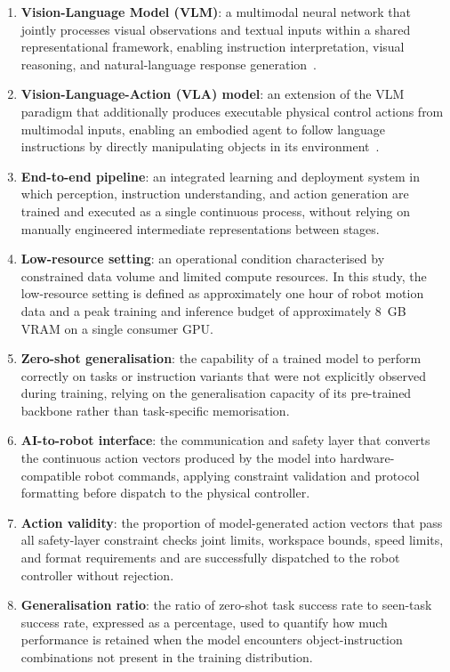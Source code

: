 \begin{enumerate}
    \item \textbf{Vision-Language Model (VLM)}: a multimodal neural network
    that jointly processes visual observations and textual inputs within a shared
    representational framework, enabling instruction interpretation, visual
    reasoning, and natural-language response generation~\cite{liu2023llava,
    openai2023gpt4v}.

    \item \textbf{Vision-Language-Action (VLA) model}: an extension of the VLM
    paradigm that additionally produces executable physical control actions from
    multimodal inputs, enabling an embodied agent to follow language instructions
    by directly manipulating objects in its environment~\cite{brohan2023rt2,
    kim2024openvla}.

    \item \textbf{End-to-end pipeline}: an integrated learning and deployment
    system in which perception, instruction understanding, and action generation
    are trained and executed as a single continuous process, without relying on
    manually engineered intermediate representations between stages.

    \item \textbf{Low-resource setting}: an operational condition characterised
    by constrained data volume and limited compute resources. In this study,
    the low-resource setting is defined as approximately one hour of robot
    motion data and a peak training and inference budget of approximately 8~GB
    VRAM on a single consumer GPU.

    \item \textbf{Zero-shot generalisation}: the capability of a trained model to
    perform correctly on tasks or instruction variants that were not explicitly
    observed during training, relying on the generalisation capacity of its
    pre-trained backbone rather than task-specific memorisation.

    \item \textbf{AI-to-robot interface}: the communication and safety layer that
    converts the continuous action vectors produced by the model into hardware-
    compatible robot commands, applying constraint validation and protocol
    formatting before dispatch to the physical controller.

    \item \textbf{Action validity}: the proportion of model-generated action vectors
    that pass all safety-layer constraint checks  joint limits, workspace bounds,
    speed limits, and format requirements  and are successfully dispatched to the
    robot controller without rejection.

    \item \textbf{Generalisation ratio}: the ratio of zero-shot task success rate
    to seen-task success rate, expressed as a percentage, used to quantify how much
    performance is retained when the model encounters object-instruction combinations
    not present in the training distribution.
\end{enumerate}